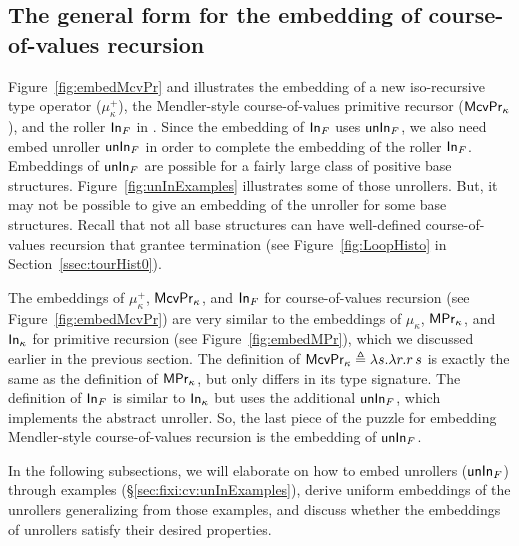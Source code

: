 \subsection{The general form for the embedding of course-of-values recursion}
Figure~\ref{fig:embedMcvPr} and illustrates the embedding of
a new iso-recursive type operator ($\mu^{+}_\kappa$),
the Mendler-style course-of-values primitive recursor ($\mathsf{McvPr}_\kappa$),
and the roller $\mathsf{In}_F$ in \Fixi. Since the embedding of $\mathsf{In}_F$ uses $\mathsf{unIn}_F$,
we also need embed unroller $\mathsf{unIn}_F$ in order to complete the embedding of
the roller $\mathsf{In}_F$. Embeddings of $\mathsf{unIn}_F$ are possible for a fairly large
class of positive base structures. Figure~\ref{fig:unInExamples} illustrates
some of those unrollers. But, it may not be possible to give an embedding
of the unroller for some base structures. Recall that not all base structures
can have well-defined course-of-values recursion that grantee termination
(see Figure~\ref{fig:LoopHisto} in Section~\ref{ssec:tourHist0}).

The embeddings of $\mu^{+}_\kappa$, $\mathsf{McvPr}_\kappa$, and $\mathsf{In}_F$
for course-of-values recursion (see Figure~\ref{fig:embedMcvPr}) are
very similar to the embeddings of $\mu_\kappa$, $\mathsf{MPr}_\kappa$, and $\mathsf{In}_\kappa$
for primitive recursion (see Figure~\ref{fig:embedMPr}), which we discussed
earlier in the previous section. The definition of
$\mathsf{McvPr}_\kappa \triangleq \lambda s.\lambda r.r\,s$ is exactly the same as
the definition of $\mathsf{MPr}_\kappa$, but only differs in its type signature.
The definition of $\mathsf{In}_F$ is similar to $\mathsf{In}_\kappa$ but uses the additional
$\mathsf{unIn}_F$, which implements the abstract unroller. So, the last piece
of the puzzle for embedding Mendler-style course-of-values recursion is
the embedding of $\mathsf{unIn}_F$.

In the following subsections, we will elaborate on how to embed unrollers
($\mathsf{unIn}_F$) through examples (\S\ref{sec:fixi:cv:unInExamples}), derive
uniform embeddings of the unrollers generalizing from those examples, and
discuss whether the embeddings of unrollers satisfy their desired properties.

